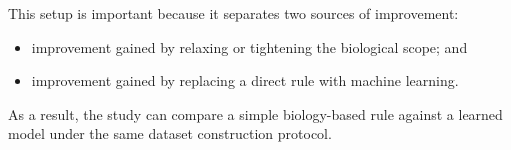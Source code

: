 This setup is important because it separates two sources of improvement:

\begin{itemize}
    \item improvement gained by relaxing or tightening the biological scope; and
    \item improvement gained by replacing a direct rule with machine learning.
\end{itemize}

As a result, the study can compare a simple biology-based rule against a learned model under the same dataset construction protocol.
